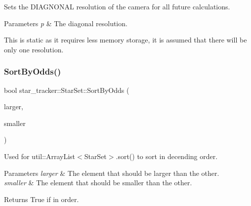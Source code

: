 Sets the D\+I\+A\+G\+N\+O\+N\+AL resolution of the camera for all future calculations. 


\begin{DoxyParams}{Parameters}
{\em p} & The diagonal resolution.\\
\hline
\end{DoxyParams}
This is static as it requires less memory storage, it is assumed that there will be only one resolution. \mbox{\label{classstar__tracker_1_1StarSet_a6073fd52d08603e0e73729a8f6319b7c}} 
\subsubsection{\texorpdfstring{Sort\+By\+Odds()}{SortByOdds()}}
{\footnotesize\ttfamily bool star\+\_\+tracker\+::\+Star\+Set\+::\+Sort\+By\+Odds (\begin{DoxyParamCaption}\item[{\hyperlink{classstar__tracker_1_1StarSet}{Star\+Set} \&}]{larger,  }\item[{\hyperlink{classstar__tracker_1_1StarSet}{Star\+Set} \&}]{smaller }\end{DoxyParamCaption})\hspace{0.3cm}{\ttfamily [static]}}



Used for util\+::\+Array\+List$<$\+Star\+Set$>$.\+sort() to sort in decending order. 


\begin{DoxyParams}{Parameters}
{\em larger} & The element that should be larger than the other. \\
\hline
{\em smaller} & The element that should be smaller than the other. \\
\hline
\end{DoxyParams}
\begin{DoxyReturn}{Returns}
True if in order. 
\end{DoxyReturn}
\mbox{\label{classstar__tracker_1_1StarSet_a29b12bd3b22a9a500a45c90e18160c2e}} 
